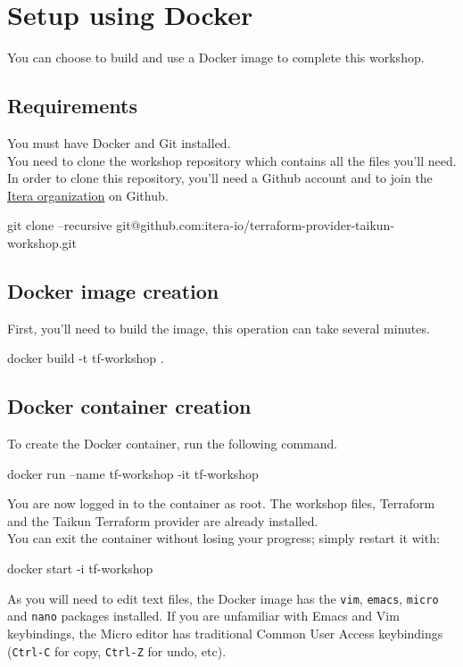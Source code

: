 \section{Setup using Docker}\label{sec:docker}

You can choose to build and use a Docker image to complete this workshop.

\subsection{Requirements}

You must have Docker and Git installed.\\
You need to clone the workshop repository which contains all the files you'll need.\\
In order to clone this repository, you'll need a Github account and to join the \href{https://github.com/itera-io}{Itera organization} on Github.

\begin{shell}
git clone --recursive git@github.com:itera-io/terraform-provider-taikun-workshop.git
\end{shell}

\subsection{Docker image creation}

First, you'll need to build the image, this operation can take several minutes.

\begin{shell}
docker build -t tf-workshop .
\end{shell}

\subsection{Docker container creation}
To create the Docker container, run the following command.
\begin{shell}
docker run --name tf-workshop -it tf-workshop
\end{shell}
You are now logged in to the container as root. The workshop files,
Terraform and the Taikun Terraform provider are already installed.\\

You can exit the container without losing your progress; simply restart it with:
\begin{shell}
docker start -i tf-workshop
\end{shell}
As you will need to edit text files, the Docker image has the \texttt{vim},
\texttt{emacs}, \texttt{micro} and \texttt{nano} packages installed.
If you are unfamiliar with Emacs and Vim keybindings, the Micro editor
has traditional Common User Access keybindings (\texttt{Ctrl-C} for copy,
\texttt{Ctrl-Z} for undo, etc).
